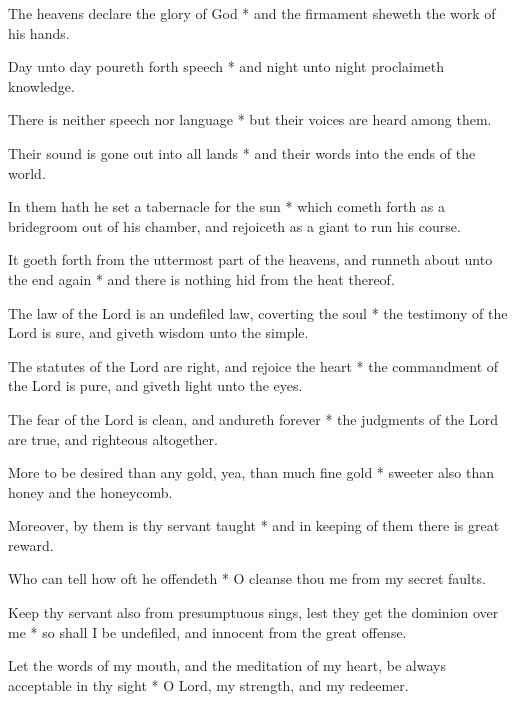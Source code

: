 The heavens declare the glory of God * and the firmament sheweth the work of his hands.

Day unto day poureth forth speech * and night unto night proclaimeth knowledge.

There is neither speech nor language * but their voices are heard among them.

Their sound is gone out into all lands * and their words into the ends of the world.

In them hath he set a tabernacle for the sun * which cometh forth as a bridegroom out of his chamber, and rejoiceth as a giant to run his course.

It goeth forth from the uttermost part of the heavens, and runneth about unto the end again * and there is nothing hid from the heat thereof.

The law of the Lord is an undefiled law, coverting the soul * the testimony of the Lord is sure, and giveth wisdom unto the simple.

The statutes of the Lord are right, and rejoice the heart * the commandment of the Lord is pure, and giveth light unto the eyes.

The fear of the Lord is clean, and andureth forever * the judgments of the Lord are true, and righteous altogether.

More to be desired than any gold, yea, than much fine gold * sweeter also than honey and the honeycomb.

Moreover, by them is thy servant taught * and in keeping of them there is great reward.

Who can tell how oft he offendeth * O cleanse thou me from my secret faults.

Keep thy servant also from presumptuous sings, lest they get the dominion over me * so shall I be undefiled, and innocent from the great offense.

Let the words of my mouth, and the meditation of my heart, be always acceptable in thy sight * O Lord, my strength, and my redeemer.